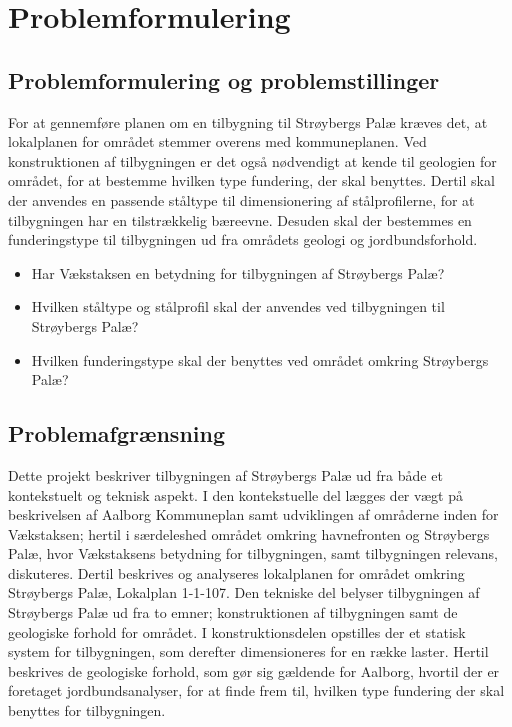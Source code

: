 \chapter{Problemformulering}

\section{Problemformulering og problemstillinger}
For at gennemføre planen om en tilbygning til Strøybergs Palæ kræves det, at lokalplanen for området stemmer overens med kommuneplanen. Ved konstruktionen af tilbygningen er det også nødvendigt at kende til geologien for området, for at bestemme hvilken type fundering, der skal benyttes. Dertil skal der anvendes en passende ståltype til dimensionering af stålprofilerne, for at tilbygningen har en tilstrækkelig bæreevne. Desuden skal der bestemmes en funderingstype til tilbygningen ud fra områdets geologi og jordbundsforhold. 

\begin{itemize} 
	\item Har Vækstaksen en betydning for tilbygningen af Strøybergs Palæ?
	\item Hvilken ståltype og stålprofil skal der anvendes ved tilbygningen til Strøybergs Palæ? 
	\item Hvilken funderingstype skal der benyttes ved området omkring Strøybergs Palæ? 
\end{itemize} 

\section{Problemafgrænsning}
Dette projekt beskriver tilbygningen af Strøybergs Palæ ud fra både et kontekstuelt og teknisk aspekt. I den kontekstuelle del lægges der vægt på beskrivelsen af Aalborg Kommuneplan samt udviklingen af områderne inden for Vækstaksen; hertil i særdeleshed området omkring havnefronten og Strøybergs Palæ, hvor Vækstaksens betydning for tilbygningen, samt tilbygningen relevans, diskuteres. Dertil beskrives og analyseres lokalplanen for området omkring Strøybergs Palæ, Lokalplan 1-1-107.
\newline \indent{     }  Den tekniske del belyser tilbygningen af Strøybergs Palæ ud fra to emner; konstruktionen af tilbygningen samt de geologiske forhold for området. I konstruktionsdelen opstilles der et statisk system for tilbygningen, som derefter dimensioneres for en række laster. 
\newline \indent{     }  Hertil beskrives de geologiske forhold, som gør sig gældende for Aalborg, hvortil der er foretaget jordbundsanalyser, for at finde frem til, hvilken type fundering der skal benyttes for tilbygningen.  